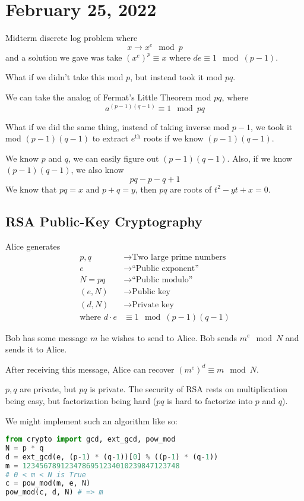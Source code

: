 \section{February 25, 2022}
\recall Midterm discrete log problem where
\[x\to x^e\mod p\]
and a solution we gave was take $(x^e)^p\equiv x$ where $de\equiv 1\mod (p-1)$.

What if we didn't take this mod $p$, but instead took it mod $pq$.

We can take the analog of Fermat's Little Theorem mod $pq$, where
\[a^{(p-1)(q-1)}\equiv 1\mod pq\]

What if we did the same thing, instead of taking inverse mod $p-1$, we took it mod $(p-1)(q-1)$ to extract $e^\mathrm{th}$ roots if we know $(p-1)(q-1)$.

We know $p$ and $q$, we can easily figure out $(p-1)(q-1)$. Also, if we know $(p-1)(q-1)$, we also know
\[pq-p-q+1\]
We know that $pq = x$ and $p+q = y$, then $pq$ are roots of $t^2-yt+x=0$.

\subsection{RSA Public-Key Cryptography}
Alice generates
\begin{align*}
    p, q                  & \to \text{Two large prime numbers} \\
    e                     & \to \text{``Public exponent''}     \\
    N = pq                & \to \text{``Public modulo''}       \\
    \boxed{(e, N)}        & \to \text{Public key}              \\
    (d, N)                & \to \text{Private key}             \\
    \text{where }d\cdot e & \equiv 1\mod(p-1)(q-1)
\end{align*}

Bob has some message $m$ he wishes to send to Alice. Bob sends $m^e\mod N$ and sends it to Alice.

After receiving this message, Alice can recover $(m^e)^d\equiv m\mod N$.

$p, q$ are private, but $pq$ is private. The security of RSA rests on multiplication being easy, but factorization being hard ($pq$ is hard to factorize into $p$ and $q$).

We might implement such an algorithm like so:
\begin{lstlisting}[language=Python]
from crypto import gcd, ext_gcd, pow_mod
N = p * q
d = ext_gcd(e, (p-1) * (q-1))[0] % ((p-1) * (q-1))
m = 1234567891234786951234010239847123748
# 0 < m < N is True
c = pow_mod(m, e, N)
pow_mod(c, d, N) # => m
\end{lstlisting}


